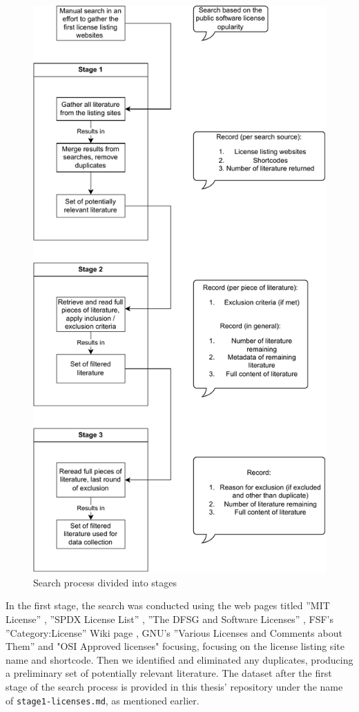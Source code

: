 \begin{figure}
	\centering
	\includegraphics[scale=0.67]{figures/search-process.pdf}
	\caption{Search process divided into stages}
	\label{fig:search-process}
\end{figure}

In the first stage, the search was conducted using the web pages titled  ''MIT License'' \citep{wikipedia:mit}, ''SPDX License List'' \citep{spdx:licenses}, ''The DFSG and Software Licenses'' \citep{debian:dfsg}, FSF's ''Category:License'' Wiki page \citep{fsf:licenselist}, GNU's ''Various Licenses and Comments about Them'' \citep{gnu:licenselist} and "OSI Approved licenses" \citep{osi:licenselist} focusing, focusing on the license listing site name and shortcode. Then we identified and eliminated any duplicates, producing a preliminary set of potentially relevant literature. The dataset after the first stage of the search process is provided in this thesis' repository \citep{mscthesis} under the name of \texttt{stage1-licenses.md}, as mentioned earlier.


